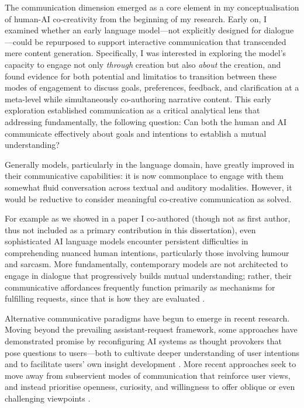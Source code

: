 The communication dimension emerged as a core element in my conceptualisation of human-AI co-creativity from the beginning of my research. Early on, I examined whether an early language model—not explicitly designed for dialogue—could be repurposed to support interactive communication that transcended mere content generation. Specifically, I was interested in exploring the model's capacity to engage not only \textit{through} creation but also \textit{about} the creation, and found evidence for both potential and limitatios to transition between these modes of engagement to discuss goals, preferences, feedback, and clarification at a meta-level while simultaneously co-authoring narrative content. This early exploration established communication as a critical analytical lens that addressing fundamentally, the following question: Can both the human and AI communicate effectively about goals and intentions to establish a mutual understanding?

Generally models, particularly in the language domain, have greatly improved in their communicative capabilities: it is now commonplace to engage with them somewhat fluid conversation across textual and auditory modalities. However, it would be reductive to consider meaningful co-creative communication as solved. 

For example as we showed in a paper I co-authored (though not as first author, thus not included as a primary contribution in this dissertation), even sophisticated AI language models encounter persistent difficulties in comprehending nuanced human intentions, particularly those involving humour and sarcasm. More fundamentally, contemporary models are not architected to engage in dialogue that progressively builds mutual understanding; rather, their communicative affordances frequently function primarily as mechanisms for fulfilling requests, since that is how they are evaluated \cite{Ouyang2022-af}.

Alternative communicative paradigms have begun to emerge in recent research. Moving beyond the prevailing assistant-request framework, some approaches have demonstrated promise by reconfiguring AI systems as thought provokers that pose questions to users—both to cultivate deeper understanding of user intentions and to facilitate users' own insight development \cite{Kim2023-wt}. More recent approaches seek to move away from subservient modes of communication that reinforce user views, and instead prioritise openness, curiosity, and willingness to offer oblique or even challenging viewpoints \cite{Anthropic2024-ne}.

